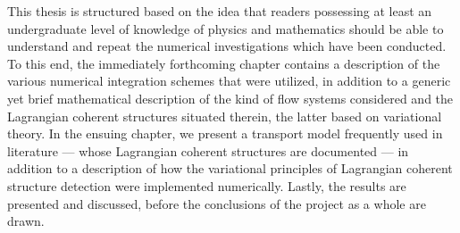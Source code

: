 This thesis is structured based on the idea that readers possessing
at least an undergraduate level of knowledge of physics and mathematics should
be able to understand and repeat the numerical investigations which have been
conducted. To this end, the immediately forthcoming chapter contains a
description of the various numerical integration schemes that were
utilized, in addition to a generic yet brief mathematical description of
the kind of flow systems considered and the Lagrangian coherent structures
situated therein, the latter based on variational theory. In the ensuing
chapter, we present a transport model frequently used in literature --- whose
Lagrangian coherent structures are documented --- in addition to a description
of how the variational principles of Lagrangian coherent structure detection
were implemented numerically. Lastly, the results are presented and discussed,
before the conclusions of the project as a whole are drawn.


